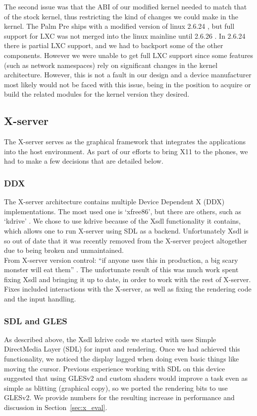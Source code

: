     The second issue was that the ABI of our modified kernel needed to match that of the stock kernel, thus restricting the kind of changes we could make in the kernel.  The Palm Pre ships with a modified version of linux 2.6.24 \cite{pre_kernel}, but full support for LXC was not merged into the linux mainline until 2.6.26 \cite{lxc_kernel}.  In 2.6.24 there is partial LXC support, and we had to backport some of the other components.  However we were unable to get full LXC support since some features (such as network namespaces) rely on significant changes in the kernel architecture.  However, this is not a fault in our design and a device manufacturer most likely would not be faced with this issue, being in the position to acquire or build the related modules for the kernel version they desired. \\

\subsection{X-server}

The X-server serves as the graphical framework that integrates the applications into the host environment.  As part of our efforts to bring X11 to the phones, we had to make a few decisions that are detailed below. \\

\subsubsection{DDX}
The X-server architecture contains multiple Device Dependent X (DDX) implementations.  The most used one is `xfree86', but there are others, such as `kdrive' \cite{x_glossary}.  We chose to use kdrive because of the Xsdl functionality it contains, which allows one to run X-server using SDL as a backend.  Unfortunately Xsdl is so out of date that it was recently removed from the X-server project altogether due to being broken and unmaintained. \\

From X-server version control: ``if anyone uses this in production, a big scary monster will eat them'' \cite{x_quote}.  The unfortunate result of this was much work spent fixing Xsdl and bringing it up to date, in order to work with the rest of X-server.  Fixes included interactions with the X-server, as well as fixing the rendering code and the input handling. \\

\subsubsection{SDL and GLES}
As described above, the Xsdl kdrive code we started with uses Simple DirectMedia Layer (SDL) \cite{sdl} for input and rendering.  Once we had achieved this functionality, we noticed the display lagged when doing even basic things like moving the cursor.  Previous experience working with SDL on this device suggested that using GLESv2 \cite{gles} and custom shaders would improve a task even as simple as blitting (graphical copy), so we ported the rendering bits to use GLESv2.  We provide numbers for the resulting increase in performance and discussion in Section~\ref{sec:x_eval}.

